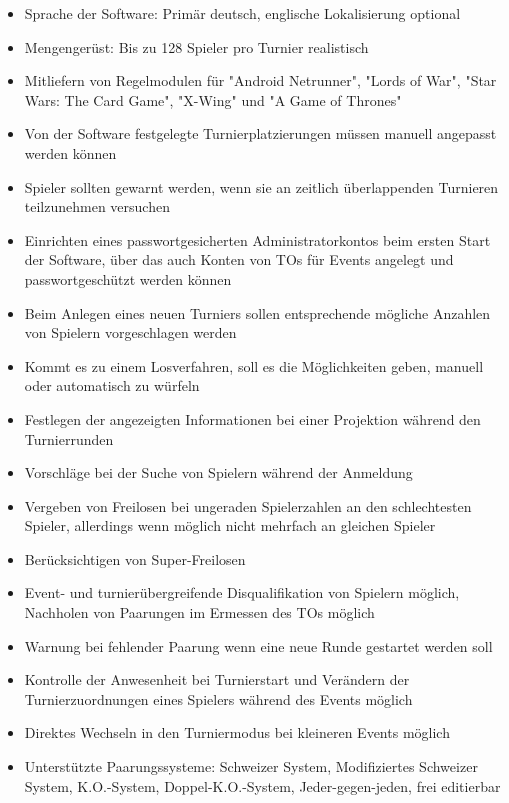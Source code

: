 \documentclass[11pt]{article}
\begin{document}
\begin{itemize}
	\item Sprache der Software: Primär deutsch, englische Lokalisierung optional
	\item Mengengerüst: Bis zu 128 Spieler pro Turnier realistisch
	\item Mitliefern von Regelmodulen für "Android Netrunner", "Lords of War", "Star Wars: The Card Game", "X-Wing" und "A Game of Thrones"
	\item Von der Software festgelegte Turnierplatzierungen müssen manuell angepasst werden können
	\item Spieler sollten gewarnt werden, wenn sie an zeitlich überlappenden Turnieren teilzunehmen versuchen
	\item Einrichten eines passwortgesicherten Administratorkontos beim ersten Start der Software, über das auch Konten von TOs für Events angelegt und passwortgeschützt werden können
	\item Beim Anlegen eines neuen Turniers sollen entsprechende mögliche Anzahlen von Spielern vorgeschlagen werden
	\item Kommt es zu einem Losverfahren, soll es die Möglichkeiten geben, manuell oder automatisch zu würfeln
	\item Festlegen der angezeigten Informationen bei einer Projektion während den Turnierrunden
	\item Vorschläge bei der Suche von Spielern während der Anmeldung
	\item Vergeben von Freilosen bei ungeraden Spielerzahlen an den schlechtesten Spieler, allerdings wenn möglich nicht mehrfach an gleichen Spieler
	\item Berücksichtigen von Super-Freilosen
	\item Event- und turnierübergreifende Disqualifikation von Spielern möglich, Nachholen von Paarungen im Ermessen des TOs möglich
	\item Warnung bei fehlender Paarung wenn eine neue Runde gestartet werden soll
	\item Kontrolle der Anwesenheit bei Turnierstart und Verändern der Turnierzuordnungen eines Spielers während des Events möglich
	\item Direktes Wechseln in den Turniermodus bei kleineren Events möglich
	\item Unterstützte Paarungssysteme: Schweizer System, Modifiziertes Schweizer System, K.O.-System, Doppel-K.O.-System, Jeder-gegen-jeden, frei editierbar
\end{itemize}
\end{document}
